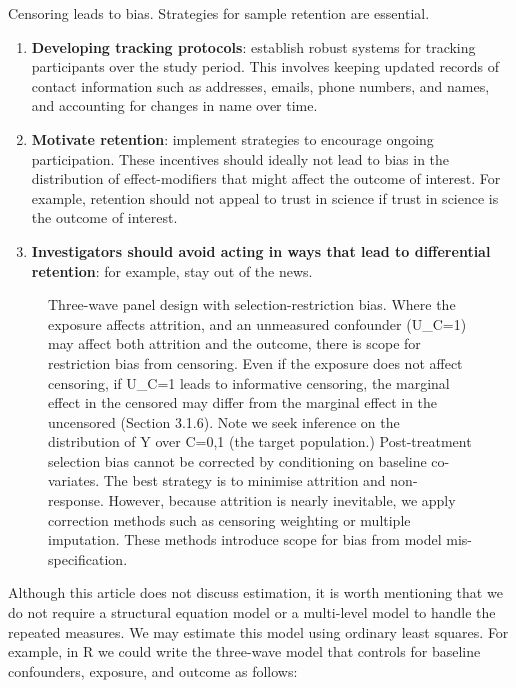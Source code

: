 \documentclass[
  singlecolumn]{article}
\begin{document}
Censoring leads to bias. Strategies for sample retention are essential.

\begin{enumerate}
\def\labelenumi{\alph{enumi}.}
\item
  \textbf{Developing tracking protocols}: establish robust systems for
  tracking participants over the study period. This involves keeping
  updated records of contact information such as addresses, emails,
  phone numbers, and names, and accounting for changes in name over
  time.
\item
  \textbf{Motivate retention}: implement strategies to encourage ongoing
  participation. These incentives should ideally not lead to bias in the
  distribution of effect-modifiers that might affect the outcome of
  interest. For example, retention should not appeal to trust in science
  if trust in science is the outcome of interest.
\item
  \textbf{Investigators should avoid acting in ways that lead to
  differential retention}: for example, stay out of the news.
\end{enumerate}

\begin{figure}


\caption{\label{fig-dag-1}Three-wave panel design with
selection-restriction bias. Where the exposure affects attrition, and an
unmeasured confounder (U\_C=1) may affect both attrition and the
outcome, there is scope for restriction bias from censoring. Even if the
exposure does not affect censoring, if U\_C=1 leads to informative
censoring, the marginal effect in the censored may differ from the
marginal effect in the uncensored (Section 3.1.6). Note we seek
inference on the distribution of Y over C=0,1 (the target population.)
Post-treatment selection bias cannot be corrected by conditioning on
baseline co-variates. The best strategy is to minimise attrition and
non-response. However, because attrition is nearly inevitable, we apply
correction methods such as censoring weighting or multiple imputation.
These methods introduce scope for bias from model mis-specification.}

\end{figure}%

Although this article does not discuss estimation, it is worth
mentioning that we do not require a structural equation model or a
multi-level model to handle the repeated measures. We may estimate this
model using ordinary least squares. For example, in R we could write the
three-wave model that controls for baseline confounders, exposure, and
outcome as follows:
\end{document}

